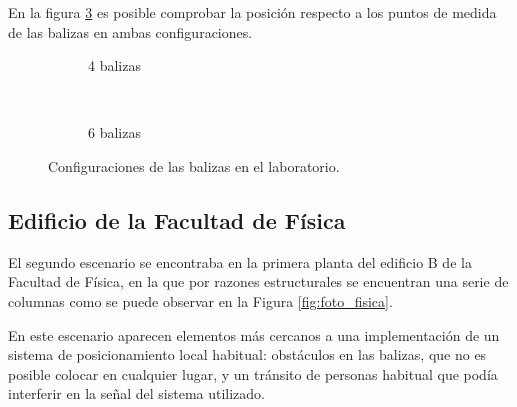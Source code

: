 En la figura \ref{fig:lab_sensores} es posible comprobar la posición respecto a los puntos de medida de las balizas en ambas configuraciones.

\begin{figure}[H]
  \begin{subfigure}[b]{.5\textwidth}
    \centering
    \def\svgwidth{0.7\linewidth}
     
    \caption{4 balizas}
    \label{fig:lab_4sens}
  \end{subfigure}
  \ \
  \begin{subfigure}[b]{.5\textwidth}
    \centering
    \def\svgwidth{0.82\linewidth}
      
    \caption{6 balizas}
    \label{fig:lab_6sens}
  \end{subfigure}
  \caption{Configuraciones de las balizas en el laboratorio.}
  \label{fig:lab_sensores}
\end{figure}

\subsection{Edificio de la Facultad de Física}

El segundo escenario se encontraba en la primera planta del edificio B de la Facultad de Física, en la que por razones estructurales se encuentran una serie de columnas como se puede observar en la Figura \ref{fig:foto_fisica}.

En este escenario aparecen elementos más cercanos a una implementación de un sistema de posicionamiento local habitual: obstáculos en las balizas, que no es posible colocar en cualquier lugar, y un tránsito de personas habitual que podía interferir en la señal del sistema utilizado.

